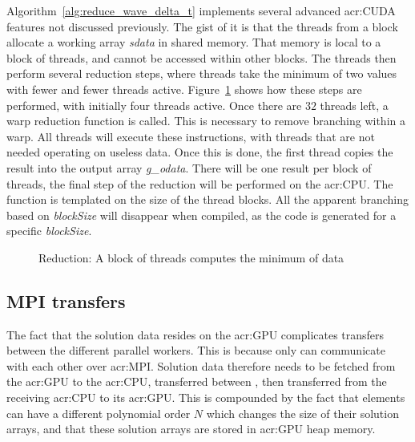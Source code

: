 Algorithm~\ref{alg:reduce_wave_delta_t} implements several advanced \acrshort{acr:CUDA} features not
discussed previously. The gist of it is that the threads from a block allocate a working array
\textit{sdata} in shared memory. That memory is local to a block of threads, and cannot be accessed
within other blocks. The threads then perform several reduction steps, where threads take the
minimum of two values with fewer and fewer threads active. Figure~\ref{fig:reduction} shows how
these steps are performed, with initially four threads active. Once there are \(32\) threads left, a
warp reduction function is called. This is necessary to remove branching within a warp. All threads
will execute these instructions, with threads that are not needed operating on useless data. Once
this is done, the first thread copies the result into the output array \textit{g\_odata}. There will
be one result per block of threads, the final step of the reduction will be performed on the
\acrshort{acr:CPU}. The function is templated on the size of the thread blocks. All the apparent
branching based on \textit{blockSize} will disappear when compiled, as the code is generated for a
specific \textit{blockSize}.

\begin{figure}[H]
    \centering
    
    \caption{Reduction: A block of threads computes the minimum of data}\label{fig:reduction}
\end{figure}

\subsection{MPI transfers}\label{subsection:graphics_processing_units:implementation:mpi_transfers}

The fact that the solution data resides on the \acrshort{acr:GPU} complicates transfers between the
different parallel workers. This is because only  can communicate with each
other over \acrshort{acr:MPI}. Solution data therefore needs to be fetched from the
\acrshort{acr:GPU} to the \acrshort{acr:CPU}, transferred between , then
transferred from the receiving \acrshort{acr:CPU} to its \acrshort{acr:GPU}. This is compounded by
the fact that elements can have a different polynomial order \(N\) which changes the size of their
solution arrays, and that these solution arrays are stored in \acrshort{acr:GPU} heap memory.

